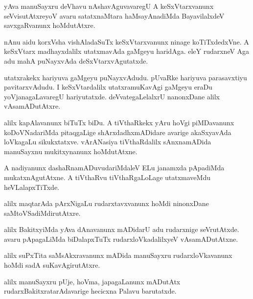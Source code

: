 \documentclass{article}
\begin{document}
\begin{mn}%
yAva manuSayxru deVhavu nAshavAguvavaregU A keSxVtarxvanunx
seVvisutAtxreyoV avaru satatxnaMtara haMsayAnadiMda BayavilalxdeV
savxgaRvanunx hoMdutAtxre.
\end{mn}

\begin{mn}
nAnu aidu korxVsha vishAladaSuTx keSxVtarxvanunx ninage
koTiTxdedxVne. A keSxVtarx madhayxdalilx utatxmavAda gaMgeyu
haridAga. eleY rudarxneV Aga adu mahA puNayxvAda deSxVtarxvAgutatxde.
\end{mn}

\begin{mn}%
utatxrakekx hariyuva gaMgeyu puNayxvAdudu. pUvaRke hariyuva
parasavxtiyu pavitarxvAdudu. I keSxVtardalilx utatxramuKavAgi gaMgeyu
eraDu yoVjanagaLavaregU hariyutatxde. deVvategaLelalxrU nanonxDane
alilx vAsamADutAtxre.
\end{mn}

\begin{mn}
alilx kapAlavanunx biTuTx biDu. A tiVthaRkekx yAru hoVgi piMDavanunx
koDoVNadariMda pitaqgaLige shArxdadhxmADidare avarige akaSxyavAda
loVkagaLu sikukxtatxve. vArANasiya tiVthaRdalilx sAnxnamADida
manuSayxnu mukitxynanunx hoMdutAtxne.
\end{mn}

\begin{mn}%
A nadiyanunx dashaRnamADuvudariMdaleV ELu janamxda pApadiMda
mukatxnAgutAtxne. A tiVthaRvu tiVthaRgaLoLage utatxmaveMdu heVLalapxTiTxde.
\end{mn}

\begin{mn}
alilx maqtarAda pArxNigaLu rudarxtavxvanunx hoMdi ninonxDane saMtoVSadiMdirutAtxre.
\end{mn}

\begin{mn}
alilx BakitxyiMda yAva dAnavanunx mADidarU adu rudarxnige
seVrutAtxde. avaru pApagaLiMda biDalapxTuTx rudarxloVkadalilxyeV vAsamADutAtxne.
\end{mn}

\begin{mn}
alilx suPxTita saMsAkxravanunx mADida manuSayxru rudarxloVkavanunx
hoMdi sadA suKavAgirutAtxre.
\end{mn}

\begin{mn}
alilx manuSayxru pUje, hoVma, japagaLanunx mADutAtx
rudarxBakitxratarAdavarige hecicxna Palavu barutatxde.
\end{mn}
\end{document}
